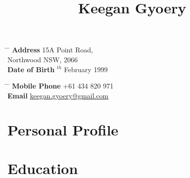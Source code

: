 \documentclass[10pt]{article} %
\begin{document}

\title{Keegan Gyoery} %


\parbox{0.5\textwidth}{ %
\begin{tabbing} %
\hspace{3cm} \= \hspace{4cm} \= \kill %
{\bf Address} \> 15A Point Road,\\ %
\> Northwood NSW, 2066 \\ %
{\bf Date of Birth} $^{th}$ February 1999\\ %
\end{tabbing}}
\hfill %
\parbox{0.5\textwidth}{ %
\begin{tabbing} %
\hspace{3cm} \= \hspace{4cm} \= \kill %
{\bf Mobile Phone} \> +61 434 820 971\\ %
{\bf Email} \> \href{mailto:keegan.gyoery@gmail.com}{keegan.gyoery@gmail.com}\\ %
\end{tabbing}}


\section{Personal Profile}




\section{Education}
\end{document}
